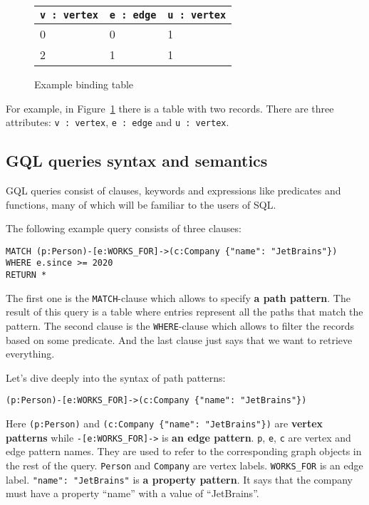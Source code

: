 \documentclass[14pt]{constructor-thesis}
\theoremstyle{definition}
\begin{document}
\begin{figure}
  \centering
  
  \begin{tabular}{ |p{3cm}|p{3cm}|p{3cm}|  }
    \hline
    \texttt{v : vertex} & \texttt{e : edge} & \texttt{u : vertex} \\
    \hline
    0 & 0 & 1 \\
    2 & 1 & 1 \\
    \hline
  \end{tabular}

  \caption{Example binding table}
  \label{fig:example-binding-table}
\end{figure}

For example, in Figure~\ref{fig:example-binding-table} there is a table with two records. There are three attributes: \texttt{v : vertex}, \texttt{e : edge} and \texttt{u : vertex}. 


\subsection{GQL queries syntax and semantics}

GQL queries consist of clauses, keywords and expressions like predicates and functions, many of which will be familiar to the users of SQL.


The following example query consists of three clauses:
\begin{verbatim}
MATCH (p:Person)-[e:WORKS_FOR]->(c:Company {"name": "JetBrains"})
WHERE e.since >= 2020
RETURN *
\end{verbatim}

The first one is the \texttt{MATCH}-clause which allows to specify \textbf{a path pattern}. The result of this query is a table where entries represent all the paths that match the pattern. The second clause is the \texttt{WHERE}-clause which allows to filter the records based on some predicate. And the last clause just says that we want to retrieve everything.

Let's dive deeply into the syntax of path patterns:
\begin{verbatim}
(p:Person)-[e:WORKS_FOR]->(c:Company {"name": "JetBrains"})
\end{verbatim}

Here \verb+(p:Person)+ and \verb+(c:Company {"name": "JetBrains"})+ are \textbf{vertex patterns} while \verb+-[e:WORKS_FOR]->+ is \textbf{an edge pattern}. \texttt{p}, \texttt{e}, \texttt{c} are vertex and edge pattern names. They are used to refer to the corresponding graph objects in the rest of the query. \texttt{Person} and \texttt{Company} are vertex labels. \texttt{WORKS\_FOR} is an edge label. \texttt{"name": "JetBrains"} is \textbf{a property pattern}. It says that the company must have a property ``name'' with a value of ``JetBrains''.
\end{document}
